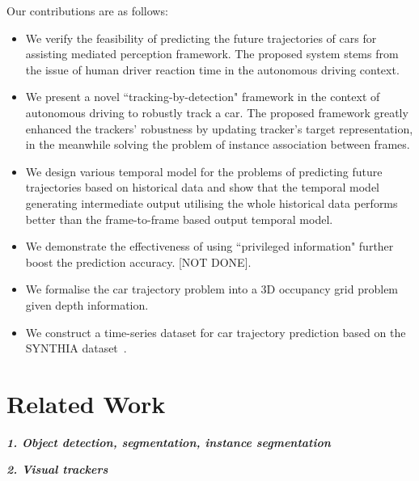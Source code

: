 \documentclass[10pt,twocolumn,letterpaper]{article}
\begin{document}
Our contributions are as follows:
\begin{itemize}

\item We verify the feasibility of predicting the future trajectories of cars for assisting mediated perception framework. The proposed system stems from the issue of human driver reaction time in the autonomous driving context.
    
\item We present a novel ``tracking-by-detection" framework in the context of autonomous driving to robustly track a car. The proposed framework greatly enhanced the trackers' robustness by updating tracker's target representation, in the meanwhile solving the problem of instance association between frames.

\item We design various temporal model for the problems of predicting future trajectories based on historical data and show that the temporal model generating intermediate output utilising the whole historical data performs better than the frame-to-frame based output temporal model.

\item We demonstrate the effectiveness of using ``privileged information" further boost the prediction accuracy. [NOT DONE].

\item We formalise the car trajectory problem into a 3D occupancy grid problem given depth information.

\item We construct a time-series dataset for car trajectory prediction based on the SYNTHIA dataset~\cite{ros2016synthia}.

\end{itemize}


\section{Related Work}

\textbf{\emph{1. Object detection, segmentation, instance segmentation}}

\textbf{\emph{2. Visual trackers}}

\end{document}
